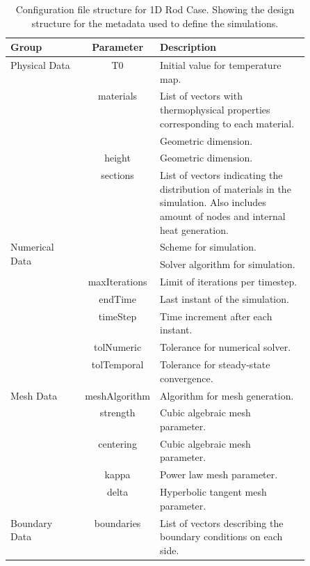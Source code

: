 \begin{table}[ht]
	\centering
	\begin{tabular}{|l|c|p{0.5\linewidth}|}
		\hline
		Group & Parameter & Description \\
		\hline
		\multirow{3}{*}{Physical Data} & T0 & Initial value for temperature map. \\
					       & \multirow{2}{*}{materials} & List of vectors with thermophysical properties corresponding to each material. \\
		\hline
		\multirow{5}{*}{Geometrical Data} & width & Geometric dimension. \\
					          & height & Geometric dimension. \\
                              & \multirow{3}{*}{sections} & List of vectors indicating the distribution of materials in the simulation. Also includes amount of nodes and internal heat generation. \\
		\hline
		\multirow{7}{*}{Numerical Data} & scheme & Scheme for simulation. \\
					     & solver & Solver algorithm for simulation. \\
					     & maxIterations & Limit of iterations per timestep. \\
					     & endTime & Last instant of the simulation. \\
					     & timeStep & Time increment after each instant. \\
					     & tolNumeric & Tolerance for numerical solver. \\
					     & tolTemporal & Tolerance for steady-state convergence. \\
		\hline
		\multirow{5}{*}{Mesh Data} & meshAlgorithm & Algorithm for mesh generation. \\
					   & strength & Cubic algebraic mesh parameter. \\
					   & centering & Cubic algebraic mesh parameter. \\
					   & kappa & Power law mesh parameter. \\
					   & delta & Hyperbolic tangent mesh parameter. \\
		\hline
		\multirow{2}{*}{Boundary Data} & \multirow{2}{*}{boundaries} & List of vectors describing the boundary conditions on each side. \\
		\hline
	\end{tabular}
	\caption{Configuration file structure for 1D Rod Case. Showing the design structure for the metadata used to define the simulations.}
	\label{tabDiffConfig1D}
\end{table}


